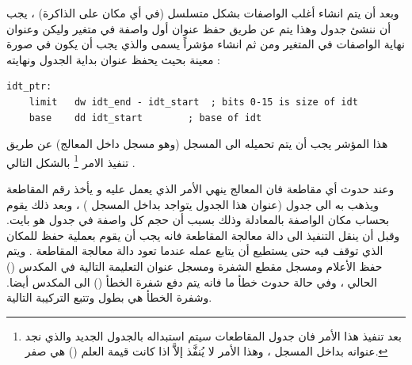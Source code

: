\documentclass[document.tex]{subfiles}
\begin{document}
وبعد أن يتم انشاء أغلب الواصفات بشكل متسلسل (في أي مكان على الذاكرة) ، يجب أن ننشئ جدول  وهذا يتم عن طريق حفظ عنوان أول واصفة في متغير وليكن  وعنوان نهاية الواصفات في المتغير  ومن ثم انشاء مؤشراً يسمى  والذي يجب أن يكون في صورة معينة بحيث يحفظ عنوان بداية الجدول ونهايته :

\begin{english}

\lstset{numberstyle=\tiny,numbersep=5pt,tabsize=2,extendedchars=true,breaklines=true,frame=b,showspaces=false, showtabs=false,xleftmargin=10pt,framexleftmargin=10pt,framexrightmargin=5pt,framexbottommargin=4pt,showstringspaces=false,language=[x86masm]Assembler}


\begin{lstlisting}[label=idt_ptr,caption=\en{Value to put in IDTR}]
idt_ptr:
	limit	dw idt_end - idt_start	; bits 0-15 is size of idt
	base	dd idt_start		; base of idt
\end{lstlisting}
\end{english}

هذا المؤشر يجب أن يتم تحميله الى المسجل  (وهو مسجل داخل المعالج) عن طريق تنفيذ الامر \footnote{بعد تنفيذ هذا الأمر فان جدول المقاطعات سيتم استبداله بالجدول الجديد والذي نجد عنوانه بداخل المسجل  ، وهذا الأمر لا يُنفَّذ إلاَّ  اذا كانت قيمة العلم () هي صفر.} بالشكل التالي .

وعند حدوث أي مقاطعة فان المعالج ينهي الأمر الذي يعمل عليه و يأخذ رقم المقاطعة ويذهب به الى جدول  (عنوان هذا الجدول يتواجد بداخل المسجل ) ، وبعد ذلك يقوم بحساب مكان الواصفة بالمعادلة  وذلك بسبب أن حجم كل واصفة في جدول  هو  بايت. وقبل أن ينقل التنفيذ الى دالة معالجة المقاطعة فانه يجب أن يقوم بعملية حفظ للمكان الذي توقف فيه حتى يستطيع أن يتابع عمله عندما تعود دالة معالجة المقاطعة . ويتم حفظ الأعلام  ومسجل مقطع الشفرة  ومسجل عنوان التعليمة التالية  في المكدس ()  الحالي ، وفي حالة حدوث خطأ ما فانه يتم دفع شفرة الخطأ () الى المكدس أيضا. وشفرة الخطأ هي بطول  وتتبع التركيبة التالية.
\end{document}
